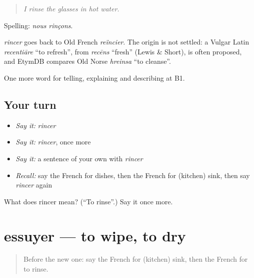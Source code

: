 \begin{quote}
\emph{I rinse the glasses in hot water.}
\end{quote}

Spelling: \emph{nous rinçons}.

\begin{cousinweb}
\emph{rincer} goes back to Old French \emph{reïncier}. The origin is not settled: a Vulgar Latin \emph{recentiāre} \textquotedblleft{}to refresh\textquotedblright{}, from \emph{recēns} \textquotedblleft{}fresh\textquotedblright{} (Lewis \& Short), is often proposed, and EtymDB compares Old Norse \emph{hreinsa} \textquotedblleft{}to cleanse\textquotedblright{}.
\end{cousinweb}

\begin{grammarlens}[title={What you've built}]
One more word for telling, explaining and describing at B1.
\end{grammarlens}

\subsection*{Your turn}
\begin{itemize}
\raggedright
  \item \emph{Say it:} \emph{rincer}
  \item \emph{Say it:} \emph{rincer}, once more
  \item \emph{Say it:} a sentence of your own with \emph{rincer}
  \item \emph{Recall:} say the French for dishes, then the French for (kitchen) sink, then say \emph{rincer} again
\end{itemize}

\begin{tcolorbox}[breakable,colback=teal!4,colframe=teal!35!black,title={Before you move on}]
What does rincer mean? (\textquotedblleft{}To rinse\textquotedblright{}.) Say it once more.
\end{tcolorbox}
\section[essuyer]{essuyer — to wipe, to dry}

\label{lesson:FR-C530-essuyer}



\begin{quote}
Before the new one: say the French for (kitchen) sink, then the French for to rinse.
\end{quote}

